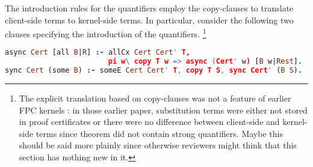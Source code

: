 \documentclass[a4paper,USenglish]{lipics-v2018}
\begin{document}
The introduction rules for the quantifiers employ the copy-clauses to
translate client-side terms to kernel-side terms.
%
In particular, consider the following two \lP clauses specifying the
introduction of the quantifiers.%
\footnote{The explicit translation based on copy-clauses was not a
  feature of earlier FPC kernels
  \cite{blanco17cade,chihani13pxtp,chihani17jar}: in those earlier paper,
  substitution terms were either not stored in proof certificates or
  there were no difference between client-side and kernel-side terms
  since theorem did not contain strong quantifiers.
{\color{red} Maybe this should be said more plainly since otherwise
  reviewers might think that this section has nothing new in it.}}
%
\begin{lstlisting}[language=prolog]
async Cert [all B|R] :- allCx Cert Cert' T,
                        pi w\ copy T w => async (Cert' w) [B w|Rest].
sync Cert (some B) :- someE Cert Cert' T, copy T S, sync Cert' (B S).
\end{lstlisting}
%
\end{document}
